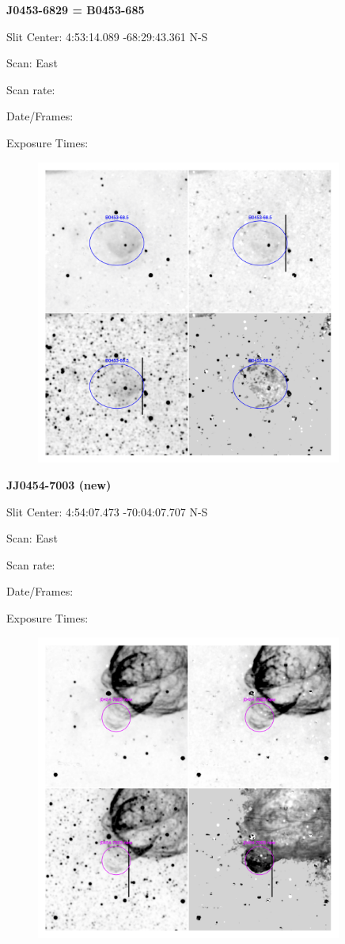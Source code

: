 \documentclass[11pt]{article}
\begin{document}
\newpage
{\bf J0453-6829 = B0453-685}

Slit Center:   4:53:14.089    -68:29:43.361     N-S

Scan:  East

Scan rate:  

Date/Frames:

Exposure Times:  

\begin{figure}
\includegraphics[width=10.05cm]{snapshots/B0453-685.png}
\end{figure}

\newpage
{\bf JJ0454-7003 (new)}

Slit Center:   4:54:07.473      -70:04:07.707     N-S

Scan:  East

Scan rate:  

Date/Frames:

Exposure Times:  

\begin{figure}
\includegraphics[width=10.05cm]{snapshots/J0454-7003.png}
\end{figure}
\end{document}
